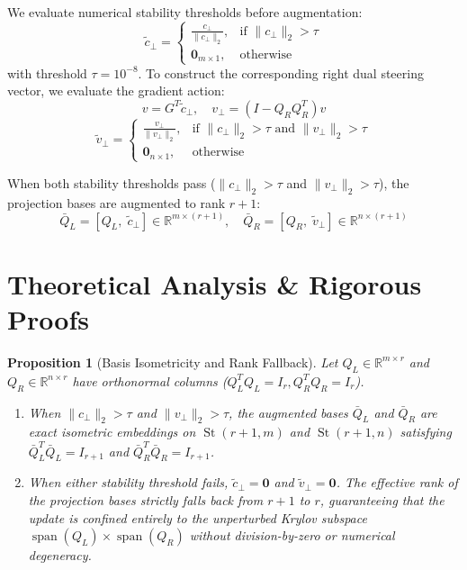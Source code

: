\documentclass[10pt,twocolumn,letterpaper]{article}
\newtheorem{proposition}{Proposition}
\begin{document}
We evaluate numerical stability thresholds before augmentation:
\begin{equation}
    \tilde{c}_\perp = \begin{cases} 
        \frac{c_\perp}{\|c_\perp\|_2}, & \text{if } \|c_\perp\|_2 > \tau \\
        \mathbf{0}_{m \times 1}, & \text{otherwise}
    \end{cases}
\end{equation}
with threshold $\tau = 10^{-8}$. To construct the corresponding right dual steering vector, we evaluate the gradient action:
\begin{equation}
    v = G^T \tilde{c}_\perp, \quad v_\perp = (I - Q_R Q_R^T) v
\end{equation}
\begin{equation}
    \tilde{v}_\perp = \begin{cases}
        \frac{v_\perp}{\|v_\perp\|_2}, & \text{if } \|c_\perp\|_2 > \tau \text{ and } \|v_\perp\|_2 > \tau \\
        \mathbf{0}_{n \times 1}, & \text{otherwise}
    \end{cases}
\end{equation}

When both stability thresholds pass ($\|c_\perp\|_2 > \tau$ and $\|v_\perp\|_2 > \tau$), the projection bases are augmented to rank $r+1$:
\begin{equation}
    \bar{Q}_L = [Q_L, \; \tilde{c}_\perp] \in \mathbb{R}^{m \times (r+1)}, \quad \bar{Q}_R = [Q_R, \; \tilde{v}_\perp] \in \mathbb{R}^{n \times (r+1)}
\end{equation}

\section{Theoretical Analysis \& Rigorous Proofs}

\begin{proposition}[Basis Isometricity and Rank Fallback]
\label{prop:ortho}
Let $Q_L \in \mathbb{R}^{m \times r}$ and $Q_R \in \mathbb{R}^{n \times r}$ have orthonormal columns ($Q_L^T Q_L = I_r, Q_R^T Q_R = I_r$).
\begin{enumerate}
    \item When $\|c_\perp\|_2 > \tau$ and $\|v_\perp\|_2 > \tau$, the augmented bases $\bar{Q}_L$ and $\bar{Q}_R$ are exact isometric embeddings on $\operatorname{St}(r+1, m)$ and $\operatorname{St}(r+1, n)$ satisfying $\bar{Q}_L^T \bar{Q}_L = I_{r+1}$ and $\bar{Q}_R^T \bar{Q}_R = I_{r+1}$.
    \item When either stability threshold fails, $\tilde{c}_\perp = \mathbf{0}$ and $\tilde{v}_\perp = \mathbf{0}$. The effective rank of the projection bases strictly falls back from $r+1$ to $r$, guaranteeing that the update is confined entirely to the unperturbed Krylov subspace $\operatorname{span}(Q_L) \times \operatorname{span}(Q_R)$ without division-by-zero or numerical degeneracy.
\end{enumerate}
\end{proposition}
\end{document}
